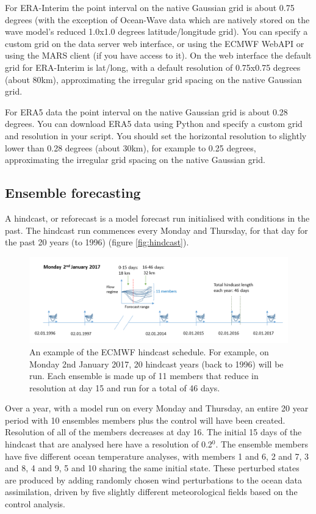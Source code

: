 For ERA-Interim the point interval on the native Gaussian grid is about 0.75 degrees (with the exception of Ocean-Wave data which are natively stored on the wave model’s reduced 1.0x1.0 degrees latitude/longitude grid). You can specify a custom grid on the data server web interface, or using the ECMWF WebAPI or using the MARS client (if you have access to it).  On the web interface the default grid for ERA-Interim is lat/long, with a default resolution of 0.75x0.75 degrees (about 80km), approximating the irregular grid spacing on the native Gaussian grid.

For ERA5 data the point interval on the native Gaussian grid is about 0.28 degrees. You can download ERA5 data using Python and specify a custom grid and resolution in your script. You should set the horizontal resolution to slightly lower than 0.28 degrees (about 30km), for example to 0.25 degrees, approximating the irregular grid spacing on the native Gaussian grid.



\subsection{Ensemble forecasting}

A hindcast, or reforecast is a model forecast run initialised with conditions in the past. The hindcast run commences every Monday and Thursday, for that day for the past 20 years (to 1996) (figure \ref{fig:hindcast}).

\begin{figure} [h]
	\includegraphics[width=34pc,angle=0]{ec_hindcast2.png}
	\caption{An example of the ECMWF hindcast schedule. For example, on Monday 2nd January 2017, 20 hindcast years (back to 1996) will be run. Each ensemble is made up of 11 members that reduce in resolution at day 15 and run for a total of 46 days.}\label{fig:ecmwf_hindcast}
	\centering
\end{figure} \label{fig:hindcast}	

Over a year, with a model run on every Monday and Thursday, an entire 20 year period with 10 ensembles members plus the control will have been created. Resolution of all of the members decreases at day 16. The initial 15 days of the hindcast that are analysed here have a resolution of 0.2$^0$. The ensemble members have five different ocean temperature analyses, with members 1 and 6, 2 and 7, 3 and 8, 4 and 9, 5 and 10 sharing the same initial state. These perturbed states are produced by adding randomly chosen wind perturbations to the ocean data assimilation, driven by five slightly different meteorological fields based on the control analysis.

